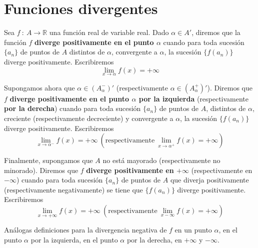 \section{Funciones divergentes}
\begin{definicion}
    Sea $f ~:~ A \longrightarrow \mathbb{R}$ una función real de variable real. Dado $\alpha \in A'$, diremos que la función $f$ \textbf{diverge positivamente en el punto $\alpha$} cuando para toda sucesión $\{a_n\}$ de puntos de $A$ distintos de $\alpha$, convergente a $\alpha$, la sucesión $\{f(a_n)\}$ diverge positivamente. Escribiremos
    \begin{equation*}
        \displaystyle\lim_{x \to \alpha} f(x) = +\infty
    \end{equation*}

    Supongamos ahora que $\alpha \in (A_{\alpha}^{-})'$ (respectivamente $\alpha \in (A_{\alpha}^{+})'$). Diremos que $f$ \textbf{diverge positivamente en el punto $\alpha$ por la izquierda} (respectivamente \textbf{por la derecha}) cuando para toda sucesión $\{a_n\}$ de puntos de $A$, distintos de $\alpha$, creciente (respectivamente decreciente) y convergente a $\alpha$, la sucesión $\{f(a_n)\}$ diverge positivamente. Escribiremos
    \begin{equation*}
        \displaystyle\lim_{x \to \alpha^{-}} f(x) = +\infty ~ (\text{respectivamente} ~ \displaystyle\lim_{x \to \alpha^{+}} f(x) = +\infty)
    \end{equation*}
    
    Finalmente, supongamos que $A$ no está mayorado (respectivamente no minorado). Diremos que $f$ \textbf{diverge positivamente en $+ \infty$} (respectivamente en $- \infty$) cuando para toda sucesión $\{a_n\}$ de puntos de $A$ que diverja positivamente (respectivamente negativamente) se tiene que $\{f(a_n)\}$ diverge positivamente. Escribiremos
    \begin{equation*}
        \displaystyle\lim_{x \to +\infty} f(x) = +\infty ~ (\text{respectivamente} ~ \displaystyle\lim_{x -\infty} f(x) = +\infty)
    \end{equation*}
    
    Análogas definiciones para la divergencia negativa de $f$ en un punto $\alpha$, en el punto $\alpha$ por la izquierda,
    en el punto $\alpha$ por la derecha, en $+ \infty$ y $- \infty$.
\end{definicion}

